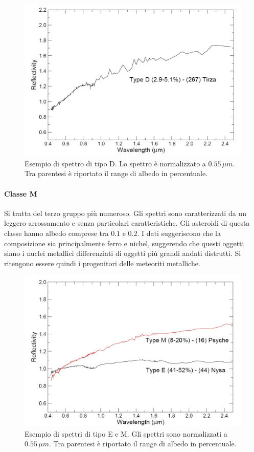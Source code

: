 \documentclass[a4paper,11pt,openright]{book}
\begin{document}
\begin{figure}
    \centering
    \includegraphics[scale=0.3]{figure/spettro_d.jpg}
    \caption[Esempio di spettro di tipo D.]{Esempio di spettro di tipo D. Lo spettro è normalizzato a $0.55\,\mu m$. Tra parentesi è riportato il range di albedo in percentuale. \citep{magrin_spectroscopic_nodate}}
    \label{spettro_d}
\end{figure}

\paragraph*{Classe M}
Si tratta del terzo gruppo più numeroso. Gli spettri sono caratterizzati da un leggero arrossamento e senza particolari caratteristiche. Gli asteroidi di questa classe hanno albedo comprese tra $0.1$ e $0.2$. I dati suggeriscono che la composizione sia principalmente ferro e nichel, suggerendo che questi oggetti siano i nuclei metallici differenziati di oggetti più grandi andati distrutti. Si ritengono essere quindi i progenitori delle meteoriti metalliche.

\begin{figure}[h]
    \centering
    \includegraphics[scale=0.3]{figure/spettro_em.jpg}
    \caption[Esempio di spettri di tipo E e M.]{Esempio di spettri di tipo E e M. Gli spettri sono normalizzati a $0.55\,\mu m$. Tra parentesi è riportato il range di albedo in percentuale. \citep{magrin_spectroscopic_nodate}}
    \label{spettro_em}
\end{figure}
\end{document}
